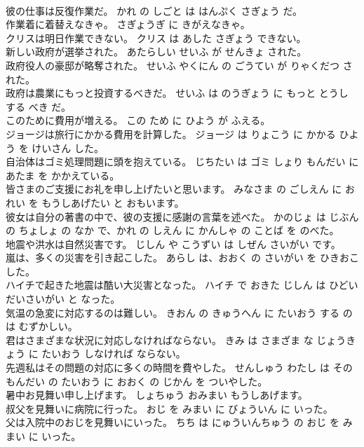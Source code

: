 \documentclass[8pt]{extreport}
\begin{document}
\begin{CJK}{UTF8}{min}
\\	彼の仕事は反復作業だ。	かれ の しごと は はんぷく さぎょう だ。	
\\	作業着に着替えなきゃ。	さぎょうぎ に きがえなきゃ。	
\\	クリスは明日作業できない。	クリス は あした さぎょう できない。	
\\	新しい政府が選挙された。	あたらしい せいふ が せんきょ された。	
\\	政府役人の豪邸が略奪された。	せいふ やくにん の ごうてい が りゃくだつ された。	
\\	政府は農業にもっと投資するべきだ。	せいふ は のうぎょう に もっと とうし する べき だ。	
\\	このために費用が増える。	この ため に ひよう が ふえる。	
\\	ジョージは旅行にかかる費用を計算した。	ジョージ は りょこう に かかる ひよう を けいさん した。	
\\	自治体はゴミ処理問題に頭を抱えている。	じちたい は ゴミ しょり もんだい に あたま を かかえている。	
\\	皆さまのご支援にお礼を申し上げたいと思います。	みなさま の ごしえん に おれい を もうしあげたい と おもいます。	
\\	彼女は自分の著書の中で、彼の支援に感謝の言葉を述べた。	かのじょ は じぶん の ちょしょ の なか で、かれ の しえん に かんしゃ の ことば を のべた。	
\\	地震や洪水は自然災害です。	じしん や こうずい は しぜん さいがい です。	
\\	嵐は、多くの災害を引き起こした。	あらし は、おおく の さいがい を ひきおこした。	
\\	ハイチで起きた地震は酷い大災害となった。	ハイチ で おきた じしん は ひどい だいさいがい と なった。	
\\	気温の急変に対応するのは難しい。	きおん の きゅうへん に たいおう する のは むずかしい。	
\\	君はさまざまな状況に対応しなければならない。	きみ は さまざま な じょうきょう に たいおう しなければ ならない。	
\\	先週私はその問題の対応に多くの時間を費やした。	せんしゅう わたし は その もんだい の たいおう に おおく の じかん を ついやした。	
\\	暑中お見舞い申し上げます。	しょちゅう おみまい もうしあげます。	
\\	叔父を見舞いに病院に行った。	おじ を みまい に びょういん に いった。	
\\	父は入院中のおじを見舞いにいった。	ちち は にゅういんちゅう の おじ を みまい に いった。	

\end{CJK}
\end{document}

